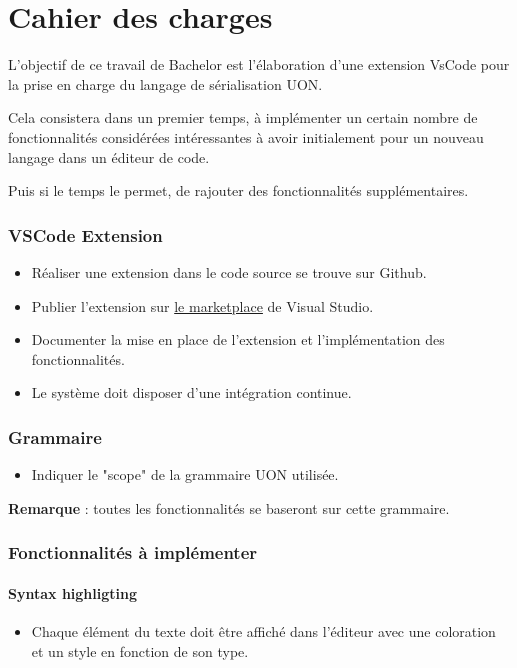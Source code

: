 \documentclass[
    iict, %
    il, %
]{heig-tb}
\begin{document}
\let\cleardoublepage\clearpage

\chapter{Cahier des charges}

L'objectif de ce travail de Bachelor est l'élaboration d'une extension VsCode pour la prise en charge du langage de sérialisation UON.

Cela consistera dans un premier temps, à implémenter un certain nombre de fonctionnalités considérées intéressantes à avoir initialement pour un nouveau langage dans un éditeur de code.

Puis si le temps le permet, de rajouter des fonctionnalités supplémentaires.

\subsection*{VSCode Extension}
\begin{itemize}
    \item Réaliser une extension dans le code source se trouve sur Github.
    \item Publier l'extension sur \href{https://marketplace.visualstudio.com/}{le marketplace} de Visual Studio.
    \item Documenter la mise en place de l'extension et l'implémentation des fonctionnalités.
    \item Le système doit disposer d'une intégration continue.
\end{itemize}

\subsection*{Grammaire}
\begin{itemize}
    \item Indiquer le "scope" de la grammaire UON utilisée.
\end{itemize}
\textbf{Remarque} : toutes les fonctionnalités se baseront sur cette grammaire.

\subsection*{Fonctionnalités à implémenter}
\subsubsection*{Syntax highligting}
\begin{itemize}
    \item Chaque élément du texte doit être affiché dans l'éditeur avec une coloration et un style en fonction de son type.
\end{itemize}
\end{document}

